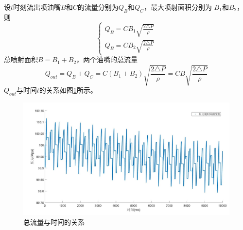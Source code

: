 \documentclass[withoutpreface,bwprint]{cumcmthesis} %
\begin{document}
    设$t$时刻流出喷油嘴$B$和$C$的流量分别为$Q_B$和$Q_C$，最大喷射面积分别为
    $B_1$和$B_2$，则
    \begin{equation}
        \begin{cases}
            Q_B=CB_1\sqrt{\frac{2 \triangle P}{\rho}} \\
            Q_B=CB_2\sqrt{\frac{2 \triangle P}{\rho}}
        \end{cases}
    \label{equ56}
    \end{equation}
    总喷射面积$B=B_1+B_2$，两个油嘴的总流量
    \begin{equation}
        Q_{out}=Q_B+Q_C=C(B_1+B_2)\sqrt{\frac{2 \triangle P}{\rho}}
        =CB\sqrt{\frac{2 \triangle P}{\rho}}
    \label{equ57}
    \end{equation}
    $Q_{out}$与时间$t$的关系如图\ref{figure16}所示。
    \begin{figure}[!h]
        \centering
        \includegraphics[width=.95\textwidth]{q210s.jpg}
        \caption{总流量与时间的关系}
        \label{figure16}
    \end{figure}
\end{document}
